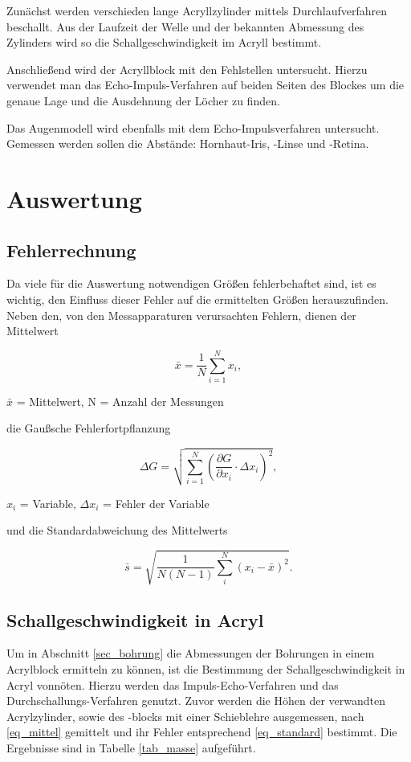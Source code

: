 Zunächst werden verschieden lange Acryllzylinder mittels Durchlaufverfahren beschallt. Aus der Laufzeit der Welle und der bekannten Abmessung des Zylinders wird so die Schallgeschwindigkeit im Acryll bestimmt.

Anschließend wird der Acryllblock mit den Fehlstellen untersucht. Hierzu verwendet man das Echo-Impuls-Verfahren auf beiden Seiten des Blockes um die genaue Lage und die Ausdehnung der Löcher zu finden.

Das Augenmodell wird ebenfalls mit dem Echo-Impulsverfahren untersucht. Gemessen werden sollen die Abstände: Hornhaut-Iris, -Linse und -Retina.


\section{Auswertung}
\subsection{Fehlerrechnung}
Da viele für die Auswertung notwendigen Größen fehlerbehaftet sind, ist es wichtig, den Einfluss dieser Fehler auf die ermittelten
Größen herauszufinden. Neben den, von den Messapparaturen verursachten Fehlern, dienen der Mittelwert
\begin{formel}[H]
\begin{equation}
 \bar{x} = \frac1N \sum_{i=1}^{N} x_i,
 \label{eq_mittel}
\end{equation}
\caption*{\small{$\bar{x}$ = Mittelwert, N = Anzahl der Messungen}}
\end{formel}

die Gaußsche Fehlerfortpflanzung

\begin{formel}[H]
\begin{equation}
\Delta G = \sqrt{\sum_{i=1}^{N}\left( \frac{\partial G}{\partial x_i}\cdot \Delta x_i\right)^2},
\label{gauss}
\end{equation}
\caption*{$x_i$ = Variable, $\Delta x_i$ = Fehler der Variable}
\end{formel}
und die Standardabweichung des Mittelwerts

\begin{equation}
 \bar s = \sqrt{\frac{1}{N(N-1)} \sum_{i}^{N} (x_i - \bar{x})^2}.
 \label{eq_standard}
\end{equation}

\subsection{Schallgeschwindigkeit in Acryl}
Um in Abschnitt \ref{sec_bohrung} die Abmessungen der Bohrungen in einem Acrylblock ermitteln zu können, ist die Bestimmung der Schallgeschwindigkeit 
in Acryl vonnöten. Hierzu werden das Impuls-Echo-Verfahren und das Durchschallungs-Verfahren genutzt. Zuvor werden die Höhen der verwandten
Acrylzylinder, sowie des -blocks mit einer Schieblehre ausgemessen, nach \eqref{eq_mittel} gemittelt und ihr Fehler entsprechend 
\eqref{eq_standard} bestimmt. Die Ergebnisse sind in Tabelle \ref{tab_masse} aufgeführt.

